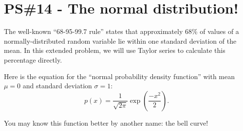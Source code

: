 


%


\allowdisplaybreaks
\section{PS\#14 - The normal distribution! }

\everymath{\displaystyle}

The well-known ``68-95-99.7 rule'' states that approximately 68\% of values of a normally-distributed random variable lie within one standard deviation of the mean. In this extended problem, we will use Taylor series to calculate this percentage directly.

Here is the equation for the ``normal probability density function'' with mean $\mu=0$ and standard deviation $\sigma=1$: \[p(x) = \frac{1}{\sqrt{2\pi}} \exp\left(\frac{-x^2}{2}\right).\]

You may know this function better by another name: the bell curve!


